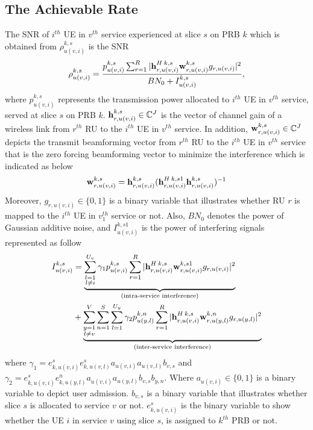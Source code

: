 \documentclass[conference]{IEEEtran}
\begin{document}
\subsection{The Achievable Rate}
The SNR of $i^{th}$ UE in $v^{th}$ service experienced at slice $s$ on PRB $k$ which is obtained from
 $\rho_{u(v,i)}^{k,s}$ is the SNR 
\begin{equation}\label{eq2}
\rho_{u(v,i)}^{k,s} =  \frac{p_{u(v,i)}^{k,s}\sum_{r=1}^{R}|{\bold{h}_{r,u(v,i)}^{H \: k,s}} \bold{w}_{r,u(v,i)}^{k,s} g_{r,u(v,i)}|^2}{BN_0 + I_{u(v,i)}^{k,s}},
\end{equation} 
where $p_{u(v,i)}^{k,s}$ represents the transmission power allocated to $i^{th}$ UE in $v^{th}$ service, served at slice $s$ on PRB $k$. 
${\bold{h}_{r,u(v,i)}^{k,s}} \in \mathbb{C}^{J}$ is the vector of channel gain of a wireless link from 
$r^{th}$ RU to the $i^{th}$ UE in $v^{th}$ service. In addition, $\bold{w}_{r,u(v,i)}^{k,s} \in \mathbb{C}^{J}$ depicts the  transmit beamforming vector from $r^{th}$ RU to the $i^{th}$ UE in $v^{th}$ service that is the zero forcing beamforming vector to minimize the interference which is indicated as below
\begin{equation}
\bold{w}_{r,u(v,i)}^{k,s} = {\bold{h}_{r,u(v,i)}^{k,s}}({\bold{h}_{r,u(v,i)}^{H \: k,s1}} {\bold{h}_{r,u(v,i)}^{k,s}})^{-1}
\end{equation}
Moreover, $g_{r,u(v,i)} \in \{0,1\}$ is a binary variable that illustrates whether RU $r$ is mapped to the $i^{th}$ UE in $v_{1}^{th}$ service or not. 
Also, $BN_0$ denotes the power of Gaussian additive noise, and $I_{u(v,i)}^{k,s1}$ is the power of interfering signals represented as follow
\begin{equation}
\begin{split}
I_{u(v,i)}^{k,s} &=
 \underbrace{\sum_{\substack{l=1 \\ l\neq i}}^{{U}_{v}} \gamma_{1}  p_{u(v,i)}^{k,s}\sum_{r=1}^{R}|{\bold{h}_{r,u(v,i)}^{H \: k,s}} \bold{w}_{r,u(v,i)}^{k,s1} g_{r,u(v,i)}|^2}_{\text{(intra-service interference)}}\\
&+ \underbrace{\sum_{\substack{y=1 \\ l\neq v}}^{V}\sum_{n=1}^{S}\sum_{l=1}^{{U}_y} \gamma_{2}  p_{u(y,l)}^{k,n}\sum_{r=1}^{R}|{\bold{h}_{r,u(v,i)}^{H \: k,s}} \bold{w}_{r,u(y,l)}^{k,n} g_{r,u(y,l)}|^2}_{\text{(inter-service interference)}}\\
\end{split}
\end{equation}
where $\gamma_{1} = e^{s}_{k,u(v,i)}e^{s}_{k,u(v,l)}a_{u(v,i)}a_{u(v,l)} b_{v, s} $
and $\gamma_{2} = e^{s}_{k,u(v,i)}e^{n}_{k,u(y,l)}a_{u(v,i)}a_{u(y,l)} b_{v, s} b_{y,n} $.
Where $a_{u(v,i)} \in \{0,1\}$ is a binary variable to depict user admission.
$b_{v, s}$ is a binary variable that illustrates whether slice $s$ is allocated to service $v$ or not. 
$e^{s}_{k,u(v,i)}$ is the binary variable to show whether the UE $i$ in service $v$ using slice $s$, is assigned to $k^{th}$ PRB or not.
\end{document}
